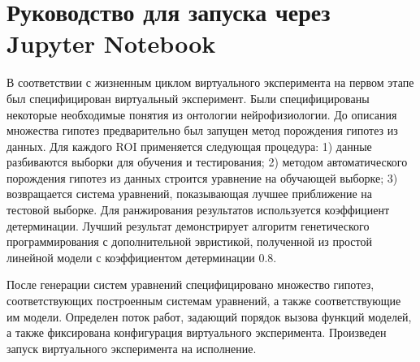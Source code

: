 \section{Руководство для запуска через Jupyter Notebook}\label{sect5_0}
В соответствии с жизненным циклом виртуального эксперимента на первом этапе был специфицирован виртуальный эксперимент. Были специфицированы некоторые необходимые понятия из онтологии нейрофизиологии. До описания множества гипотез предварительно был запущен метод порождения гипотез из данных. Для каждого ROI применяется следующая процедура: 1) данные разбиваются выборки для обучения и тестирования; 2) методом автоматического порождения гипотез из данных строится уравнение на обучающей выборке; 3) возвращается система уравнений, показывающая лучшее приближение на тестовой выборке. Для ранжирования результатов используется коэффициент детерминации. Лучший результат демонстрирует алгоритм генетического программирования с дополнительной эвристикой, полученной из простой линейной модели с коэффициентом детерминации 0.8.

После генерации систем уравнений специфицировано множество гипотез, соответствующих построенным системам уравнений, а также соответствующие им модели. Определен поток работ, задающий порядок вызова функций моделей, а также фиксирована конфигурация виртуального эксперимента. Произведен запуск виртуального эксперимента на исполнение.

